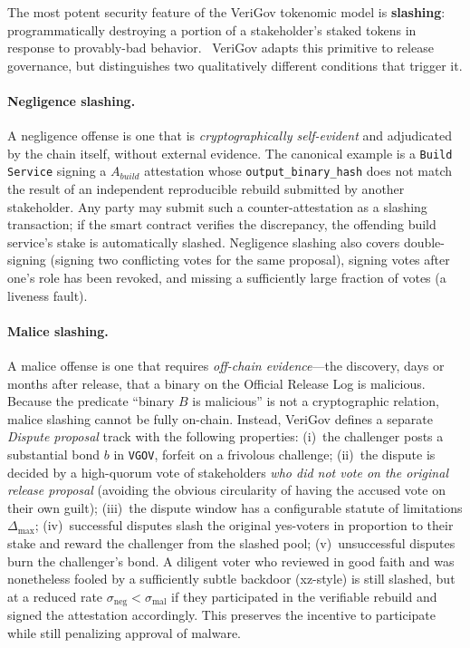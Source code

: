 \documentclass{article}
\begin{document}
The most potent security feature of the VeriGov tokenomic model is \textbf{slashing}: programmatically destroying a portion of a stakeholder's staked tokens in response to provably-bad behavior.~\cite{buterin2017casper} VeriGov adapts this primitive to release governance, but distinguishes two qualitatively different conditions that trigger it.

\paragraph{Negligence slashing.} A negligence offense is one that is \emph{cryptographically self-evident} and adjudicated by the chain itself, without external evidence. The canonical example is a \texttt{Build Service} signing a $A_{build}$ attestation whose \texttt{output\_binary\_hash} does not match the result of an independent reproducible rebuild submitted by another stakeholder. Any party may submit such a counter-attestation as a slashing transaction; if the smart contract verifies the discrepancy, the offending build service's stake is automatically slashed. Negligence slashing also covers double-signing (signing two conflicting votes for the same proposal), signing votes after one's role has been revoked, and missing a sufficiently large fraction of votes (a liveness fault).

\paragraph{Malice slashing.} A malice offense is one that requires \emph{off-chain evidence}---the discovery, days or months after release, that a binary on the Official Release Log is malicious. Because the predicate ``binary $B$ is malicious'' is not a cryptographic relation, malice slashing cannot be fully on-chain. Instead, VeriGov defines a separate \emph{Dispute proposal} track with the following properties: (i)~the challenger posts a substantial bond $b$ in \texttt{VGOV}, forfeit on a frivolous challenge; (ii)~the dispute is decided by a high-quorum vote of stakeholders \emph{who did not vote on the original release proposal} (avoiding the obvious circularity of having the accused vote on their own guilt); (iii)~the dispute window has a configurable statute of limitations $\Delta_{\max}$; (iv)~successful disputes slash the original yes-voters in proportion to their stake and reward the challenger from the slashed pool; (v)~unsuccessful disputes burn the challenger's bond. A diligent voter who reviewed in good faith and was nonetheless fooled by a sufficiently subtle backdoor (xz-style) is still slashed, but at a reduced rate $\sigma_{\text{neg}} < \sigma_{\text{mal}}$ if they participated in the verifiable rebuild and signed the attestation accordingly. This preserves the incentive to participate while still penalizing approval of malware.
\end{document}
